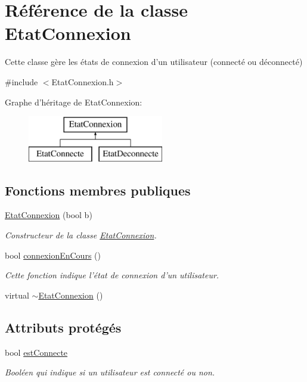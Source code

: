 \hypertarget{class_etat_connexion}{\section{Référence de la classe Etat\-Connexion}
\label{class_etat_connexion}
}


Cette classe gère les états de connexion d'un utilisateur (connecté ou déconnecté)  




{\ttfamily \#include $<$Etat\-Connexion.\-h$>$}

Graphe d'héritage de Etat\-Connexion\-:\begin{figure}[H]
\begin{center}
\leavevmode
\includegraphics[height=2.000000cm]{class_etat_connexion}
\end{center}
\end{figure}
\subsection*{Fonctions membres publiques}
\begin{DoxyCompactItemize}
\item 
\hyperlink{class_etat_connexion_ab2f7cac2d3fb8ca6b89a6e9ae65262b5}{Etat\-Connexion} (bool b)
\begin{DoxyCompactList}\small\item\em Constructeur de la classe \hyperlink{class_etat_connexion}{Etat\-Connexion}. \end{DoxyCompactList}\item 
bool \hyperlink{class_etat_connexion_acbb22c19f9b8fb864cd783c51f725c6e}{connexion\-En\-Cours} ()
\begin{DoxyCompactList}\small\item\em Cette fonction indique l'état de connexion d'un utilisateur. \end{DoxyCompactList}\item 
virtual \hyperlink{class_etat_connexion_ae225cd7492b10af15115a8773dc3bac6}{$\sim$\-Etat\-Connexion} ()
\end{DoxyCompactItemize}
\subsection*{Attributs protégés}
\begin{DoxyCompactItemize}
\item 
bool \hyperlink{class_etat_connexion_a5f0f7aa6e5ba050505fe5cf43e23aeaa}{est\-Connecte}
\begin{DoxyCompactList}\small\item\em Booléen qui indique si un utilisateur est connecté ou non. \end{DoxyCompactList}\end{DoxyCompactItemize}


